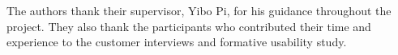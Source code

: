 
\begin{acknowledgements}
The authors thank their supervisor, Yibo Pi, for his guidance throughout the
project. They also thank the participants who contributed their time and
experience to the customer interviews and formative usability study.
\end{acknowledgements}
